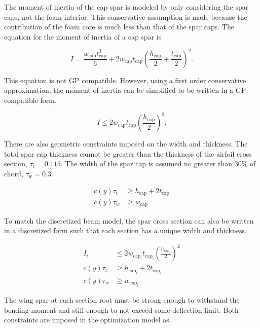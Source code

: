 The moment of inertia of the cap spar is modeled by only considering the spar caps, not the foam interior.  
This conservative assumption is made because the contribution of the foam core is much less than that of the spar caps.  
The equation for the moment of inertia\cite{bending} of a cap spar is 

\begin{equation}
    \label{e:moispar}
    I = \frac{w_{\text{cap}}t_{\text{cap}}^3}{6} + 2w_{\text{cap}}t_{\text{cap}}\left( \frac{h_{\text{cap}}}{2} + \frac{t_{\text{cap}}}{2} \right)^2.
\end{equation}

This equation is not GP compatible.  However, using a first order conservative approximation, the moment of inertia can be simplified to be written in a GP-compatible form, 

\begin{equation}
    \label{e:moispar}
    I \leq 2w_{\text{cap}}t_{\text{cap}}\left(\frac{h_{\text{cap}}}{2}\right)^2.
\end{equation}

There are also geometric constraints imposed on the width and thickness.  The total spar cap thickness cannot be greater than the thickness of the airfoil cross section, $\tau_t = 0.115$.  The width of the spar cap is assumed no greater than 30\% of chord, $\tau_w = 0.3$.

\begin{align}
    \label{e:thickness}
    c(y)\tau_t &\geq h_{\text{cap}} + 2t_{\text{cap}} \\
    \label{e:width}
    c(y)\tau_w &\geq w_{\text{cap}} 
    \end{align}

To match the discretized beam model, the spar cross section can also be written in a discretized form such that each section has a unique width and thickness. 

\begin{align}
    I_i &\leq 2w_{\text{cap}_i}t_{\text{cap}_i}\left(\frac{h_{\text{cap}_i}}{2}\right)^2 \\
    c(y)\tau_t &\geq h_{\text{cap}_i} + 2t_{\text{cap}_i} \\
    c(y)\tau_w &\geq w_{\text{cap}_i} 
\end{align}

The wing spar at each section root must be strong enough to withstand the bending moment and stiff enough to not exceed some deflection limit.  Both constraints are imposed in the optimization model as

